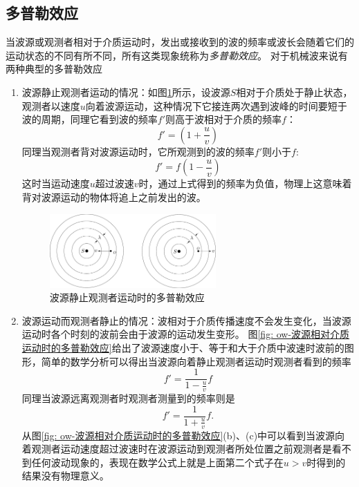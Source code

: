 \subsection{多普勒效应}
当波源或观测者相对于介质运动时，发出或接收到的波的频率或波长会随着它们的运动状态的不同有所不同，所有这类现象统称为\emph{多普勒效应}。
对于机械波来说有两种典型的多普勒效应
\begin{enumerate}
\item 波源静止观测者运动的情况：如图\ref{fig: ow-波源静止观测者运动时的多普勒效应}所示，设波源$S$相对于介质处于静止状态，观测者以速度$u$向着波源运动，这种情况下它接连两次遇到波峰的时间要短于波的周期，同理它看到波的频率$f'$则高于波相对于介质的频率$f$：
\begin{equation}
f' =\left(1+\frac{u}{v}\right)
\end{equation}
同理当观测者背对波源运动时，它所观测到的波的频率$f'$则小于$f$:
\begin{equation}
f'=f\left(1-\frac{u}{v}\right)
\end{equation}
这时当运动速度$u$超过波速$v$时，通过上式得到的频率为负值，物理上这意味着背对波源运动的物体将追上之前发出的波。
\begin{figure}[hbtp]
\centering
\includegraphics[width=0.6\textwidth]{images/ow-doppler-effect-observer.pdf}
\caption{波源静止观测者运动时的多普勒效应}\label{fig: ow-波源静止观测者运动时的多普勒效应}
\end{figure}

\item 波源运动而观测者静止的情况：波相对于介质传播速度不会发生变化，当波源运动时各个时刻的波前会由于波源的运动发生变形。
图\ref{fig: ow-波源相对介质运动时的多普勒效应}给出了波源速度小于、等于和大于介质中波速时波前的图形，简单的数学分析可以得出当波源向着静止观测者运动时观测者看到的频率
\begin{equation}
f' = \frac{1}{1-\frac{u}{v}}f
\end{equation}
同理当波源远离观测者时观测者测量到的频率则是
\begin{equation}
f'=\frac{1}{1+\frac{u}{v}}f.
\end{equation}
从图\ref{fig: ow-波源相对介质运动时的多普勒效应}(b)、(c)中可以看到当波源向着观测者运动速度超过波速时在波源运动到观测者所处位置之前观测者是看不到任何波动现象的，表现在数学公式上就是上面第二个式子在$u>v$时得到的结果没有物理意义。



\end{enumerate}
